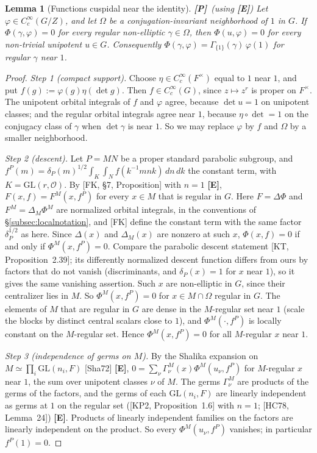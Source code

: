 \documentclass[12pt]{article}
\newcommand{\cO}{\mathcal{O}}
\newcommand{\GL}{\mathrm{GL}}
\newcommand{\Pv}{\textbf{[P]}}
\newcommand{\Ev}{\textbf{[E]}}
\theoremstyle{plain}
\newtheorem{lemma}[theorem]{Lemma}
\theoremstyle{definition}
\begin{document}
\begin{lemma}[Functions cuspidal near the identity]\label{lem:cuspnear1}\Pv\ (using \Ev)
Let $\varphi\in C_c^\infty(G/Z)$, and let $\Omega$ be a conjugation-invariant neighborhood of $1$ in $G$. If $\Phi(\gamma,\varphi)=0$ for every regular non-elliptic $\gamma\in\Omega$, then $\Phi(u,\varphi)=0$ for every non-trivial unipotent $u\in G$. Consequently $\Phi(\gamma,\varphi)=\Gamma_{\{1\}}(\gamma)\,\varphi(1)$ for regular $\gamma$ near $1$.
\end{lemma}
\begin{proof}
\emph{Step 1 (compact support).} Choose $\eta\in C_c^\infty(F^\times)$ equal to $1$ near $1$, and put $f(g):=\varphi(g)\eta(\det g)$. Then $f\in C_c^\infty(G)$, since $z\mapsto z^r$ is proper on $F^\times$. The unipotent orbital integrals of $f$ and $\varphi$ agree, because $\det u=1$ on unipotent classes; and the regular orbital integrals agree near $1$, because $\eta\circ\det=1$ on the conjugacy class of $\gamma$ when $\det\gamma$ is near $1$. So we may replace $\varphi$ by $f$ and $\Omega$ by a smaller neighborhood.

\emph{Step 2 (descent).} Let $P=MN$ be a proper standard parabolic subgroup, and $f^P(m)=\delta_P(m)^{1/2}\int_K\int_Nf(k^{-1}mnk)\,dn\,dk$ the constant term, with $K=\GL(r,\cO)$. By [FK, \S7, Proposition] with $n=1$ \Ev, $F(x,f)=F^M(x,f^P)$ for every $x\in M$ that is regular in $G$. Here $F=\Delta\Phi$ and $F^M=\Delta_M\Phi^M$ are normalized orbital integrals, in the conventions of \S\ref{subsec:localnotation}, and [FK] define the constant term with the same factor $\delta_P^{1/2}$ as here. Since $\Delta(x)$ and $\Delta_M(x)$ are nonzero at such $x$, $\Phi(x,f)=0$ if and only if $\Phi^M(x,f^P)=0$. Compare the parabolic descent statement [KT, Proposition~2.39]; its differently normalized descent function differs from ours by factors that do not vanish (discriminants, and $\delta_P(x)=1$ for $x$ near $1$), so it gives the same vanishing assertion. Such $x$ are non-elliptic in $G$, since their centralizer lies in $M$. So $\Phi^M(x,f^P)=0$ for $x\in M\cap\Omega$ regular in $G$. The elements of $M$ that are regular in $G$ are dense in the $M$-regular set near $1$ (scale the blocks by distinct central scalars close to $1$), and $\Phi^M(\cdot,f^P)$ is locally constant on the $M$-regular set. Hence $\Phi^M(x,f^P)=0$ for all $M$-regular $x$ near $1$.

\emph{Step 3 (independence of germs on $M$).} By the Shalika expansion on $M\simeq\prod_i\GL(n_i,F)$ [Sha72] \Ev, $0=\sum_\nu\Gamma^M_\nu(x)\Phi^M(u_\nu,f^P)$ for $M$-regular $x$ near $1$, the sum over unipotent classes $\nu$ of $M$. The germs $\Gamma^M_\nu$ are products of the germs of the factors, and the germs of each $\GL(n_i,F)$ are linearly independent as germs at $1$ on the regular set ([KP2, Proposition~1.6] with $n=1$; [HC78, Lemma~24]) \Ev. Products of linearly independent families on the factors are linearly independent on the product. So every $\Phi^M(u_\nu,f^P)$ vanishes; in particular $f^P(1)=0$.


\end{proof}
\end{document}

